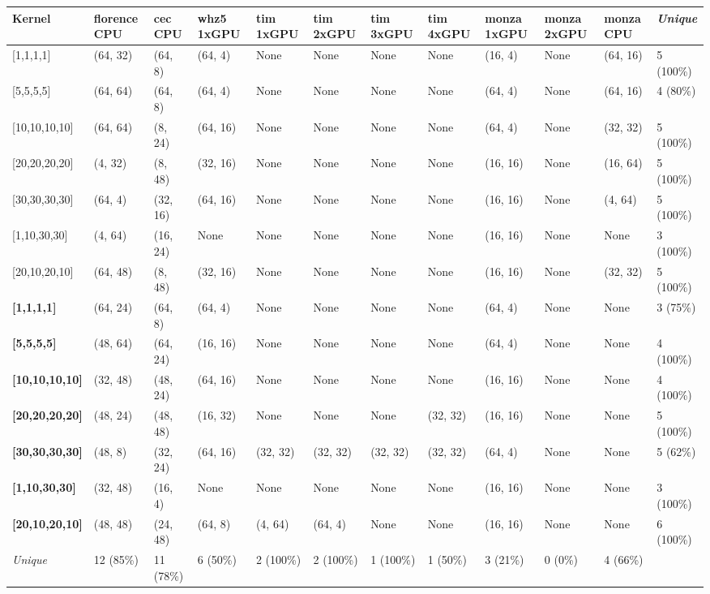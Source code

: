 \begin{tabular}{|p{1.8cm} | p{1cm} | p{1cm} | p{1cm} | p{1cm} | p{1cm} | p{1cm} | p{1cm} | p{1cm} | p{1cm} | p{1cm} | p{1.1cm}|}
\hline
\textbf{Kernel} & \textbf{florence CPU} & \textbf{cec CPU} & \textbf{whz5 1xGPU} & \textbf{tim 1xGPU} & \textbf{tim 2xGPU} & \textbf{tim 3xGPU} & \textbf{tim 4xGPU} & \textbf{monza 1xGPU} & \textbf{monza 2xGPU} & \textbf{monza CPU} & \textit{Unique}\\
\hline
{[}1,1,1,1{]} & (64, 32) & (64, 8) & (64, 4) & None & None & None & None & (16, 4) & None & (64, 16) & 5 (100\%)\\
{[}5,5,5,5{]} & (64, 64) & (64, 8) & (64, 4) & None & None & None & None & (64, 4) & None & (64, 16) & 4 (80\%)\\
{[}10,10,10,10{]} & (64, 64) & (8, 24) & (64, 16) & None & None & None & None & (64, 4) & None & (32, 32) & 5 (100\%)\\
{[}20,20,20,20{]} & (4, 32) & (8, 48) & (32, 16) & None & None & None & None & (16, 16) & None & (16, 64) & 5 (100\%)\\
{[}30,30,30,30{]} & (64, 4) & (32, 16) & (64, 16) & None & None & None & None & (16, 16) & None & (4, 64) & 5 (100\%)\\
{[}1,10,30,30{]} & (4, 64) & (16, 24) & None & None & None & None & None & (16, 16) & None & None & 3 (100\%)\\
{[}20,10,20,10{]} & (64, 48) & (8, 48) & (32, 16) & None & None & None & None & (16, 16) & None & (32, 32) & 5 (100\%)\\
\textbf{{[}1,1,1,1{]}} & (64, 24) & (64, 8) & (64, 4) & None & None & None & None & (64, 4) & None & None & 3 (75\%)\\
\textbf{{[}5,5,5,5{]}} & (48, 64) & (64, 24) & (16, 16) & None & None & None & None & (64, 4) & None & None & 4 (100\%)\\
\textbf{{[}10,10,10,10{]}} & (32, 48) & (48, 24) & (64, 16) & None & None & None & None & (16, 16) & None & None & 4 (100\%)\\
\textbf{{[}20,20,20,20{]}} & (48, 24) & (48, 48) & (16, 32) & None & None & None & (32, 32) & (16, 16) & None & None & 5 (100\%)\\
\textbf{{[}30,30,30,30{]}} & (48, 8) & (32, 24) & (64, 16) & (32, 32) & (32, 32) & (32, 32) & (32, 32) & (64, 4) & None & None & 5 (62\%)\\
\textbf{{[}1,10,30,30{]}} & (32, 48) & (16, 4) & None & None & None & None & None & (16, 16) & None & None & 3 (100\%)\\
\textbf{{[}20,10,20,10{]}} & (48, 48) & (24, 48) & (64, 8) & (4, 64) & (64, 4) & None & None & (16, 16) & None & None & 6 (100\%)\\
\hline
\textit{Unique} & 12 (85\%) & 11 (78\%) & 6 (50\%) & 2 (100\%) & 2 (100\%) & 1 (100\%) & 1 (50\%) & 3 (21\%) & 0 (0\%) & 4 (66\%) & \\
\hline
\end{tabular}
